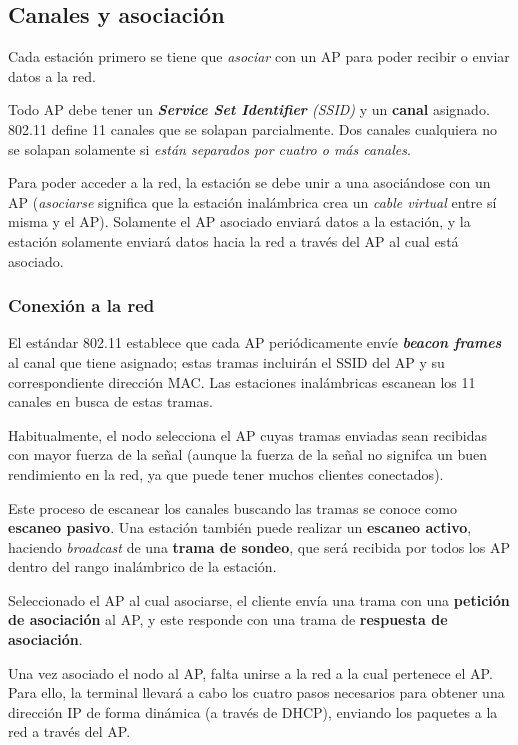 \subsection{Canales y asociación}

Cada estación primero se tiene que \emph{asociar} con un AP para poder recibir o enviar datos a la red. 

Todo AP debe tener un \emph{\textbf{Service Set Identifier} (SSID)} y un \textbf{canal} asignado. 802.11 define 11 canales que se solapan parcialmente. Dos canales cualquiera no se solapan solamente si \emph{están separados por cuatro o más canales}. 

Para poder acceder a la red, la estación se debe unir a una asociándose con un AP (\emph{asociarse} significa que la estación inalámbrica crea un \emph{cable virtual} entre sí misma y el AP). Solamente el AP asociado enviará datos a la estación, y la estación solamente enviará datos hacia la red a través del AP al cual está asociado.

\subsubsection{Conexión a la red}

El estándar 802.11 establece que cada AP periódicamente envíe \emph{\textbf{beacon frames}} al canal que tiene asignado; estas tramas incluirán el SSID del AP y su correspondiente dirección MAC. Las estaciones inalámbricas escanean los 11 canales en busca de estas tramas.

Habitualmente, el nodo selecciona el AP cuyas tramas enviadas sean recibidas con mayor fuerza de la señal (aunque la fuerza de la señal no signifca un buen rendimiento en la red, ya que puede tener muchos clientes conectados).

Este proceso de escanear los canales buscando las tramas se conoce como \textbf{escaneo pasivo}. Una estación también puede realizar un \textbf{escaneo activo}, haciendo \emph{broadcast} de una \textbf{trama de sondeo}, que será recibida por todos los AP dentro del rango inalámbrico de la estación.    

Seleccionado el AP al cual asociarse, el cliente envía una trama con una \textbf{petición de asociación} al AP, y este responde con una trama de \textbf{respuesta de asociación}.

Una vez asociado el nodo al AP, falta unirse a la red a la cual pertenece el AP. Para ello, la terminal llevará a cabo los cuatro pasos necesarios para obtener una dirección IP de forma dinámica (a través de DHCP), enviando los paquetes a la red a través del AP.

